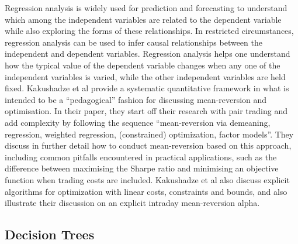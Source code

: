 Regression analysis is widely used for prediction and forecasting to understand which among the independent variables are related to the dependent variable while also exploring the forms of these relationships. In restricted circumstances, regression analysis can be used to infer causal relationships between the independent and dependent variables. Regression analysis helps one understand how the typical value of the dependent variable changes when any one of the independent variables is varied, while the other independent variables are held fixed. Kakushadze et al provide a systematic quantitative framework in what is intended to be a “pedagogical” fashion for discussing mean-reversion and optimisation.\cite{Kakushadze:2015aa} In their paper, they start off their research with pair trading and add complexity by following the sequence “mean-reversion via demeaning, regression, weighted regression, (constrained) optimization, factor models”. They discuss in further detail how to conduct mean-reversion based on this approach, including common pitfalls encountered in practical applications, such as the difference between maximising the Sharpe ratio and minimising an objective function when trading costs are included. Kakushadze et al also discuss explicit algorithms for optimization with linear costs, constraints and bounds, and also illustrate their discussion on an explicit intraday mean-reversion alpha.

\subsection{Decision Trees}

